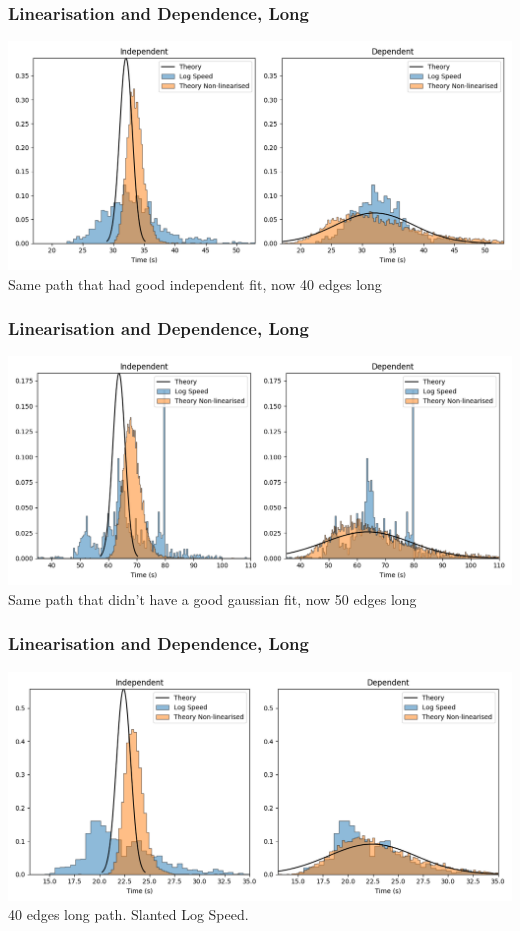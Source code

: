 \documentclass{beamer}
\begin{document}
	\begin{frame}
		\frametitle{Linearisation and Dependence, Long}
		\includegraphics[width=\textwidth,height=\textheight,keepaspectratio]{non-lin10-40B.png}
		Same path that had good independent fit, now 40 edges long
	\end{frame}
	\begin{frame}
		\frametitle{Linearisation and Dependence, Long}
		\includegraphics[width=\textwidth,height=\textheight,keepaspectratio]{non-lin8-50A.png}
		Same path that didn't have a good gaussian fit, now 50 edges long
	\end{frame}
	\begin{frame}
		\frametitle{Linearisation and Dependence, Long}
		\includegraphics[width=\textwidth,height=\textheight,keepaspectratio]{non-lin12-40A.png}
		40 edges long path. Slanted Log Speed.
	\end{frame}
\end{document}
